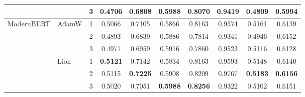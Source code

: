 \documentclass[conference]{IEEEtran}
\begin{document}
\begin{table}[t]
\begin{tabular}{llcccccccc}
 & & 3 & 0.4706 & 0.6808 & \textbf{0.5988} & 0.8070 & 0.9419 & 0.4809 & 0.5994 \\
\midrule
\multirow{6}{*}{ModernBERT} & \multirow{3}{*}{AdamW} 
 & 1 & 0.5066 & 0.7105 & 0.5866 & 0.8163 & 0.9574 & 0.5161 & 0.6139 \\
 & & 2 & 0.4893 & 0.6839 & 0.5886 & 0.7814 & 0.9341 & 0.4946 & 0.6152 \\
 & & 3 & 0.4971 & 0.6959 & 0.5916 & 0.7860 & 0.9523 & 0.5116 & 0.6128 \\
\cmidrule{2-10}
 & \multirow{3}{*}{Lion} 
 & 1 & \textbf{0.5121} & 0.7142 & 0.5834 & 0.8163 & 0.9593 & 0.5148 & 0.6140 \\
 & & 2 & 0.5115 & \textbf{0.7225} & 0.5908 & 0.8209 & 0.9767 & \textbf{0.5183} & \textbf{0.6156} \\
 & & 3 & 0.5020 & 0.7051 & \textbf{0.5988} & \textbf{0.8256} & 0.9322 & 0.5102 & 0.6151 \\
\bottomrule
\end{tabular}
\end{table}
\end{document}
